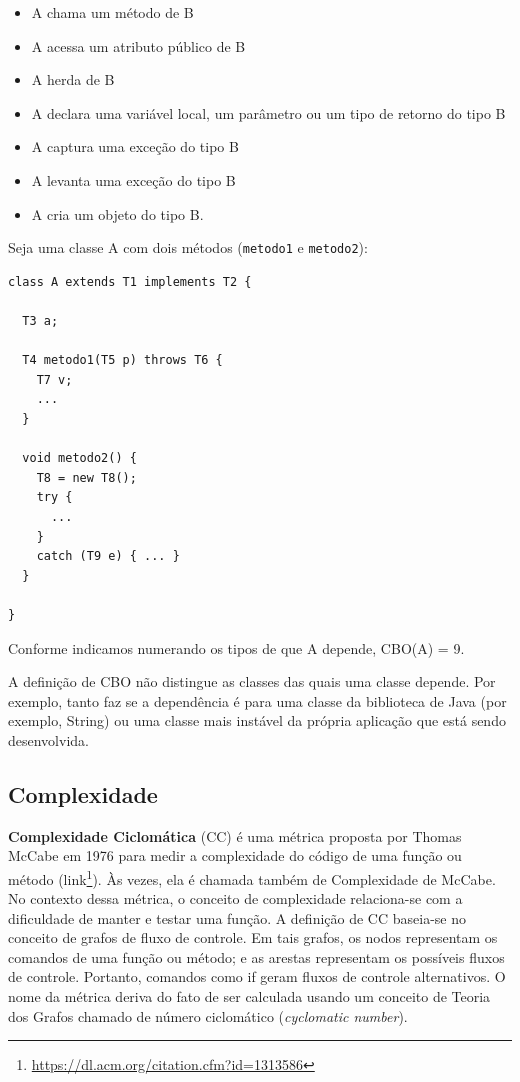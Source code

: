 \documentclass[
  11pt,
  twoside]{book}
\newcommand{\passthrough}[1]{#1}
\DeclareRobustCommand{\href}[2]{#2\footnote{\url{#1}}}
\begin{document}
\begin{itemize}
\item
  A chama um método de B
\item
  A acessa um atributo público de B
\item
  A herda de B
\item
  A declara uma variável local, um parâmetro ou um tipo de retorno do
  tipo B
\item
  A captura uma exceção do tipo B
\item
  A levanta uma exceção do tipo B
\item
  A cria um objeto do tipo B.
\end{itemize}

Seja uma classe A com dois métodos (\passthrough{\lstinline!metodo1!} e
\passthrough{\lstinline!metodo2!}):

\begin{lstlisting}
class A extends T1 implements T2 {

  T3 a;

  T4 metodo1(T5 p) throws T6 {
    T7 v;
    ...
  }

  void metodo2() {
    T8 = new T8();
    try {
      ...
    }
    catch (T9 e) { ... }
  }

}
\end{lstlisting}

Conforme indicamos numerando os tipos de que A depende, CBO(A) = 9.

A definição de CBO não distingue as classes das quais uma classe
depende. Por exemplo, tanto faz se a dependência é para uma classe da
biblioteca de Java (por exemplo, String) ou uma classe mais instável da
própria aplicação que está sendo desenvolvida.

\hypertarget{complexidade}{%
\subsection{Complexidade}\label{complexidade}}

 

\textbf{Complexidade Ciclomática} (CC) é uma métrica proposta por Thomas
McCabe em 1976 para medir a complexidade do código de uma função ou
método (\href{https://dl.acm.org/citation.cfm?id=1313586}{link}). Às
vezes, ela é chamada também de Complexidade de McCabe. No contexto dessa
métrica, o conceito de complexidade relaciona-se com a dificuldade de
manter e testar uma função. A definição de CC baseia-se no conceito de
grafos de fluxo de controle. Em tais grafos, os nodos representam os
comandos de uma função ou método; e as arestas representam os possíveis
fluxos de controle. Portanto, comandos como if geram fluxos de controle
alternativos. O nome da métrica deriva do fato de ser calculada usando
um conceito de Teoria dos Grafos chamado de número ciclomático
(\emph{cyclomatic number}).
\end{document}
